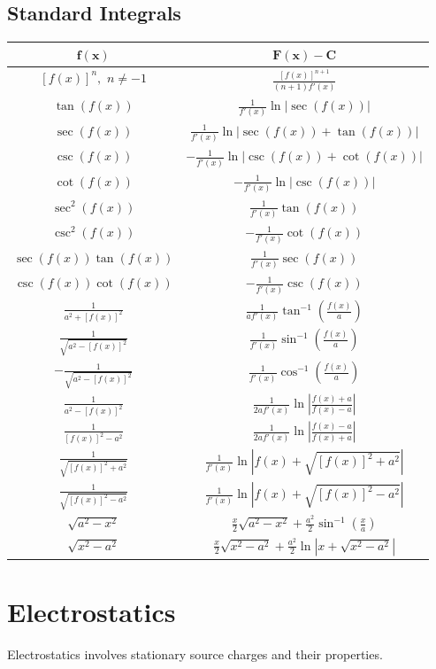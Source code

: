 \documentclass[12pt, a4paper]{article}
\begin{document}
\begin{multicols*}{3}
\subsection{Standard Integrals}
{\centering
\begin{tabular}{|c|c|}
\hline
$\mathbf{f(x)}$ & $\mathbf{F(x) - C}$ \\ \hline
$[f(x)]^n,$ $n\neq -1$ & $\frac{[f(x)]^{n+1}}{(n+1)f'(x)} $\\ \hline
$\tan(f(x))$ & $\frac{1}{f'(x)}\ln|\sec(f(x))| $ \\ \hline
$\sec(f(x))$ & $\frac{1}{f'(x)}\ln|\sec(f(x)) + \tan(f(x))| $ \\ \hline
$\csc(f(x))$ & $-\frac{1}{f'(x)}\ln|\csc(f(x)) + \cot(f(x))| $ \\ \hline
$\cot(f(x))$ & $-\frac{1}{f'(x)}\ln|\csc(f(x))| $ \\ \hline
$\sec^2(f(x))$ & $\frac{1}{f'(x)}\tan(f(x)) $ \\ \hline
$\csc^2(f(x))$ & $-\frac{1}{f'(x)}\cot(f(x)) $ \\ \hline
$\sec(f(x))\tan(f(x))$ & $\frac{1}{f'(x)}\sec(f(x)) $ \\ \hline
$\csc(f(x))\cot(f(x))$ & $-\frac{1}{f'(x)}\csc(f(x)) $ \\ \hline
$\frac{1}{a^2+[f(x)]^2}$ & $\frac{1}{af'(x)}\tan^{-1}(\frac{f(x)}{a})$ \\ \hline
$\frac{1}{\sqrt{a^2-[f(x)]^2}}$ & $\frac{1}{f'(x)}\sin^{-1}(\frac{f(x)}{a})$ \\ \hline
$-\frac{1}{\sqrt{a^2-[f(x)]^2}}$ & $\frac{1}{f'(x)}\cos^{-1}(\frac{f(x)}{a})$ \\ \hline
$\frac{1}{a^2-[f(x)]^2}$ & $\frac{1}{2af'(x)}\ln|\frac{f(x)+a}{f(x)-a}|$ \\ \hline
$\frac{1}{[f(x)]^2-a^2}$ & $\frac{1}{2af'(x)}\ln|\frac{f(x)-a}{f(x)+a}|$ \\ \hline
$\frac{1}{\sqrt{[f(x)]^2+a^2}}$ & $\frac{1}{f'(x)}\ln|f(x)+\sqrt{[f(x)]^2+a^2}|$ \\ \hline
$\frac{1}{\sqrt{[f(x)]^2-a^2}}$ & $\frac{1}{f'(x)}\ln|f(x)+\sqrt{[f(x)]^2-a^2}|$ \\ \hline
$\sqrt{a^2-x^2}$ & $\frac{x}{2}\sqrt{a^2-x^2}+\frac{a^2}{2}\sin^{-1}(\frac{x}{a})$ \\ \hline
$\sqrt{x^2-a^2}$ & $\frac{x}{2}\sqrt{x^2-a^2}+\frac{a^2}{2}\ln|x+\sqrt{x^2-a^2}|$ \\ \hline
\end{tabular}
\par}

\colbreak
\section{Electrostatics}
Electrostatics involves stationary source charges and their properties. 


\end{multicols*}
\end{document}
